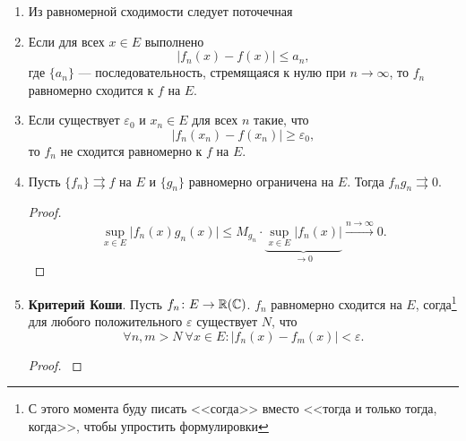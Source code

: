 \documentclass[11pt,dvipsnames]{report}
\begin{document}
\begin{prop}
    \begin{enumerate}
	\item Из равномерной сходимости следует поточечная
	\item Если для всех $ x \in E$ выполнено 
	    $$ \lvert f_n(x) - f(x) \rvert \le a_n,$$
	    где $ \{a_n\}$ --- последовательность, стремящаяся к нулю при $ n \to  \infty$, то $ f_n$ равномерно сходится к $ f$ на $ E$. 
	\item Если существует $ \varepsilon_0$ и $ x_n \in E$ для всех $ n$ такие, что
	     \[
		 \lvert f_n(x_n) - f(x_n) \rvert \ge \varepsilon_0
	    ,\] 
	    то $ f_n$ не сходится равномерно к $ f$ на $ E$.
	\item Пусть $ \{f_n\} \rightrightarrows f$ на $ E$ и $ \{g_n\}$ равномерно ограничена на $E $. Тогда $ f_ng_n \rightrightarrows 0$.
	    \begin{proof}
	        \[
		    \sup_{x \in E}\lvert f_n(x)g_n(x) \rvert \le M_{g_n} \cdot \underbrace{\sup_{x \in  E}\lvert f_n(x) \rvert }_{ \to 0} \stackrel{n \to \infty} \longrightarrow 0
	        .\] 
	    \end{proof}
	\item {\bf Критерий Коши}. Пусть $ f_n \colon E \to  \mathbb{R}(\mathbb{C})$. $ f_n$ равномерно сходится на $ E$, согда\footnote{С этого момента буду писать <<согда>> вместо <<тогда и только тогда, когда>>, чтобы упростить формулировки} для любого положительного $ \varepsilon $ существует $ N$, что
	    \[
		\forall n, m > N ~ \forall x \in  E \colon \lvert f_n(x) - f_m(x) \rvert < \varepsilon 
	    .\] 
	    \begin{proof}
	        $ $
\end{proof}
\end{enumerate}
\end{prop}
\end{document}
